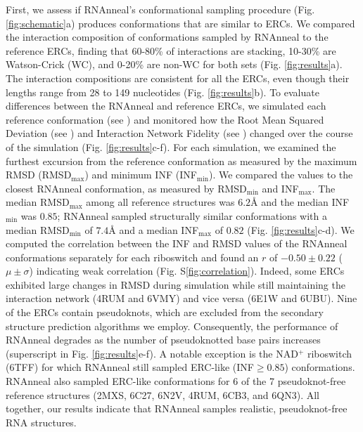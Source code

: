\documentclass[%
aip,
 amsmath,amssymb,
reprint,%
onecolumn,
]{revtex4-1}
\begin{document}
{First, we assess if RNAnneal's conformational sampling procedure (Fig. \ref{fig:schematic}a) produces conformations that are similar to ERCs. We compared the interaction composition of conformations sampled by RNAnneal to the reference ERCs, finding that 60-80\% of interactions are stacking, 10-30\% are Watson-Crick (WC), and 0-20\% are non-WC for both sets (Fig. \ref{fig:results}a). The interaction compositions are consistent for all the ERCs, even though their lengths range from 28 to 149 nucleotides (Fig. \ref{fig:results}b). To evaluate differences between the RNAnneal and reference ERCs, we simulated each reference conformation (see ) and monitored how the Root Mean Squared Deviation (see ) and Interaction Network Fidelity (see ) changed over the course of the simulation (Fig. \ref{fig:results}c-f).\cite{parisien2009new} For each simulation, we examined the furthest excursion from the reference conformation as measured by the maximum RMSD (RMSD$_{\mathrm{max}}$) and minimum INF (INF$_{\mathrm{min}}$). We compared the values to the closest RNAnneal conformation, as measured by RMSD$_{\mathrm{min}}$ and INF$_{\mathrm{max}}$. The median RMSD$_{\mathrm{max}}$ among all reference structures was $6.2${\AA} and the median INF$_{\mathrm{min}}$ was $0.85$; RNAnneal sampled structurally similar conformations with a median RMSD$_{\mathrm{min}}$ of $7.4${\AA} and a median INF$_{\mathrm{max}}$ of $0.82$ (Fig. \ref{fig:results}c-d).  We computed the correlation between the INF and RMSD values of the RNAnneal conformations separately for each riboswitch and found an $r$ of $-0.50\pm0.22$ ($\mu\pm\sigma$) indicating weak correlation (Fig. S\ref{fig:correlation}). Indeed, some ERCs exhibited large changes in RMSD during simulation while still maintaining the interaction network (4RUM and 6VMY) and vice versa (6E1W and 6UBU). Nine of the ERCs contain pseudoknots, which are excluded from the secondary structure prediction algorithms we employ. Consequently, the performance of RNAnneal degrades as the number of pseudoknotted base pairs increases (superscript in Fig. \ref{fig:results}e-f). A notable exception is the NAD$^+$ riboswitch (6TFF) for which RNAnneal still sampled ERC-like (INF$\geq0.85$) conformations. RNAnneal also sampled ERC-like conformations for 6 of the 7 pseudoknot-free reference structures (2MXS, 6C27, 6N2V, 4RUM, 6CB3, and 6QN3). All together, our results indicate that RNAnneal samples realistic, pseudoknot-free RNA structures.

}
\end{document}
